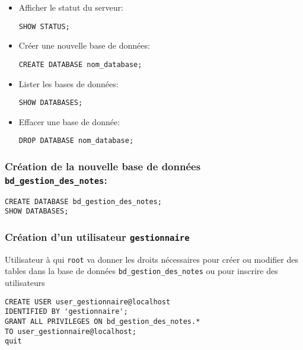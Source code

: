 \documentclass[11pt]{article}
\begin{document}
\begin{itemize}
\item Afficher le statut du serveur:\\

\begin{verbatim}
SHOW STATUS;
\end{verbatim}

\item Créer une nouvelle base de données:\\

\begin{verbatim}
CREATE DATABASE nom_database;
\end{verbatim}

\item Lister les bases de données:\\

\begin{verbatim}
SHOW DATABASES;
\end{verbatim}

\item Effacer une base de donnée:\\

\begin{verbatim}
DROP DATABASE nom_database;
\end{verbatim}
\end{itemize}





\subsubsection{Création de la nouvelle base de données \texttt{bd\_gestion\_des\_notes}:}
\label{sec:org0943a2b}
\begin{verbatim}
CREATE DATABASE bd_gestion_des_notes;
SHOW DATABASES;
\end{verbatim}

\subsubsection{Création d'un utilisateur \texttt{gestionnaire}}
\label{sec:org5da28a7}
Utilisateur à qui \texttt{root} va donner les droits nécessaires pour créer ou modifier des tables dans la base de données \texttt{bd\_gestion\_des\_notes} ou pour inscrire des utilisateurs
\begin{verbatim}
CREATE USER user_gestionnaire@localhost
IDENTIFIED BY 'gestionnaire';
GRANT ALL PRIVILEGES ON bd_gestion_des_notes.* 
TO user_gestionnaire@localhost;
quit
\end{verbatim}
\end{document}
